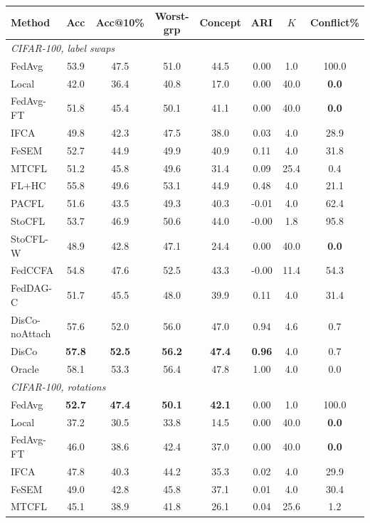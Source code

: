 \scriptsize
\setlength{\tabcolsep}{3.5pt}
\begin{tabular}{lccccccc}
\toprule
Method & Acc & Acc@10\% & Worst-grp & Concept & ARI & $K$ & Conflict\% \\
\midrule
\multicolumn{8}{l}{\textit{CIFAR-100, label swaps}}\\
FedAvg & 53.9 & 47.5 & 51.0 & 44.5 & 0.00 & 1.0 & 100.0 \\
Local & 42.0 & 36.4 & 40.8 & 17.0 & 0.00 & 40.0 & \textbf{0.0} \\
FedAvg-FT & 51.8 & 45.4 & 50.1 & 41.1 & 0.00 & 40.0 & \textbf{0.0} \\
IFCA & 49.8 & 42.3 & 47.5 & 38.0 & 0.03 & 4.0 & 28.9 \\
FeSEM & 52.7 & 44.9 & 49.9 & 40.9 & 0.11 & 4.0 & 31.8 \\
MTCFL & 51.2 & 45.8 & 49.6 & 31.4 & 0.09 & 25.4 & 0.4 \\
FL+HC & 55.8 & 49.6 & 53.1 & 44.9 & 0.48 & 4.0 & 21.1 \\
PACFL & 51.6 & 43.5 & 49.3 & 40.3 & -0.01 & 4.0 & 62.4 \\
StoCFL & 53.7 & 46.9 & 50.6 & 44.0 & -0.00 & 1.8 & 95.8 \\
StoCFL-W & 48.9 & 42.8 & 47.1 & 24.4 & 0.00 & 40.0 & \textbf{0.0} \\
FedCCFA & 54.8 & 47.6 & 52.5 & 43.3 & -0.00 & 11.4 & 54.3 \\
FedDAG-C & 51.7 & 45.5 & 48.0 & 39.9 & 0.11 & 4.0 & 31.4 \\
DisCo-noAttach & 57.6 & 52.0 & 56.0 & 47.0 & 0.94 & 4.6 & 0.7 \\
DisCo & \textbf{57.8} & \textbf{52.5} & \textbf{56.2} & \textbf{47.4} & \textbf{0.96} & 4.0 & 0.7 \\
Oracle & 58.1 & 53.3 & 56.4 & 47.8 & 1.00 & 4.0 & 0.0 \\
\midrule
\multicolumn{8}{l}{\textit{CIFAR-100, rotations}}\\
FedAvg & \textbf{52.7} & \textbf{47.4} & \textbf{50.1} & \textbf{42.1} & 0.00 & 1.0 & 100.0 \\
Local & 37.2 & 30.5 & 33.8 & 14.5 & 0.00 & 40.0 & \textbf{0.0} \\
FedAvg-FT & 46.0 & 38.6 & 42.4 & 37.0 & 0.00 & 40.0 & \textbf{0.0} \\
IFCA & 47.8 & 40.3 & 44.2 & 35.3 & 0.02 & 4.0 & 29.9 \\
FeSEM & 49.0 & 42.8 & 45.8 & 37.1 & 0.01 & 4.0 & 30.4 \\
MTCFL & 45.1 & 38.9 & 41.8 & 26.1 & 0.04 & 25.6 & 1.2 \\

\end{tabular}

